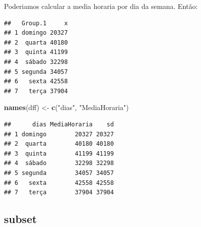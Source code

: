 \documentclass[]{book}
\newenvironment{Shaded}{\begin{snugshade}}{\end{snugshade}}
\newcommand{\KeywordTok}[1]{\textcolor[rgb]{0.13,0.29,0.53}{\textbf{#1}}}
\newcommand{\DataTypeTok}[1]{\textcolor[rgb]{0.13,0.29,0.53}{#1}}
\newcommand{\StringTok}[1]{\textcolor[rgb]{0.31,0.60,0.02}{#1}}
\newcommand{\OperatorTok}[1]{\textcolor[rgb]{0.81,0.36,0.00}{\textbf{#1}}}
\newcommand{\NormalTok}[1]{#1}
\theoremstyle{definition}
\theoremstyle{definition}
\theoremstyle{definition}
\theoremstyle{remark}
\begin{document}
Poderiamos calcular a media horaria por dia da semana. Então:

\begin{Shaded}
\end{Shaded}

\begin{verbatim}
##   Group.1     x
## 1 domingo 20327
## 2  quarta 40180
## 3  quinta 41199
## 4  sábado 32298
## 5 segunda 34057
## 6   sexta 42558
## 7   terça 37904
\end{verbatim}

\begin{Shaded}
\begin{Highlighting}[]
\KeywordTok{names}\NormalTok{(dff) <-}\StringTok{ }\KeywordTok{c}\NormalTok{(}\StringTok{"dias"}\NormalTok{, }\StringTok{"MediaHoraria"}\NormalTok{)}
\end{Highlighting}
\end{Shaded}

\begin{Shaded}
\end{Shaded}

\begin{verbatim}
##      dias MediaHoraria    sd
## 1 domingo        20327 20327
## 2  quarta        40180 40180
## 3  quinta        41199 41199
## 4  sábado        32298 32298
## 5 segunda        34057 34057
## 6   sexta        42558 42558
## 7   terça        37904 37904
\end{verbatim}

\subsection{subset}\label{subset}
\end{document}
